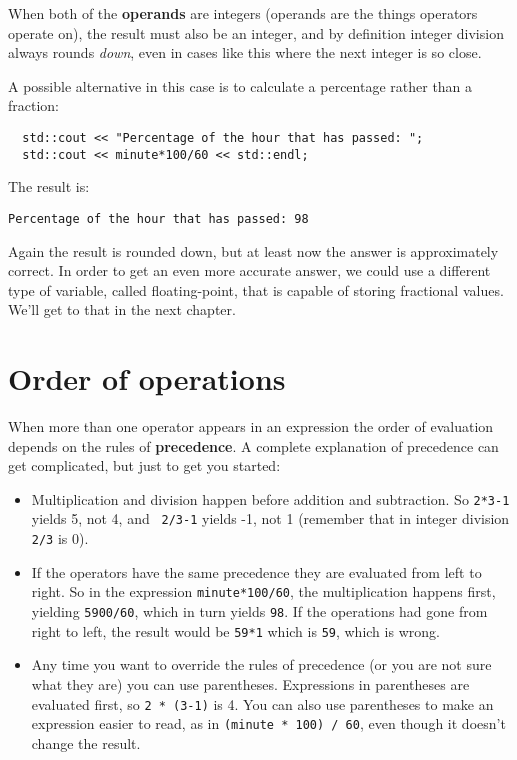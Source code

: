 
When both of the {\bf operands} are integers (operands are the things
operators operate on), the result must also be an integer,
and by definition integer division always rounds {\em down},
even in cases like this where the next integer is so close.

A possible alternative in this case is to calculate a percentage
rather than a fraction:

\begin{mdframed}
\begin{verbatim} 
  std::cout << "Percentage of the hour that has passed: ";
  std::cout << minute*100/60 << std::endl;
\end{verbatim}
\end{mdframed}

%
The result is:

\begin{verbatim}
Percentage of the hour that has passed: 98
\end{verbatim}
%
Again the result is rounded down, but at least now the answer
is approximately correct.  In order to get an even more accurate
answer, we could use a different type of variable, called
floating-point, that is capable of storing fractional values.
We'll get to that in the next chapter.

\section{Order of operations}

When more than one operator appears in an expression the order
of evaluation depends on the rules of {\bf precedence}.  A
complete explanation of precedence can get complicated, but
just to get you started:

\begin{itemize}

\item Multiplication and division happen before
addition and subtraction.  So {\tt 2*3-1} yields 5, not 4, and {\tt
2/3-1} yields -1, not 1 (remember that in integer division {\tt 2/3}
is 0).

\item If the operators have the same precedence they are evaluated
from left to right.  So in the expression {\tt minute*100/60},
the multiplication happens first, yielding {\tt 5900/60}, which
in turn yields {\tt 98}.  If the operations had gone from right
to left, the result would be {\tt 59*1} which is {\tt 59}, which
is wrong.

\item Any time you want to override the rules of precedence (or
you are not sure what they are) you can use parentheses.  Expressions
in parentheses are evaluated first, so {\tt 2 * (3-1)} is 4.
You can also use parentheses to make an expression easier to
read, as in {\tt (minute * 100) / 60}, even though it doesn't
change the result.

\end{itemize}

